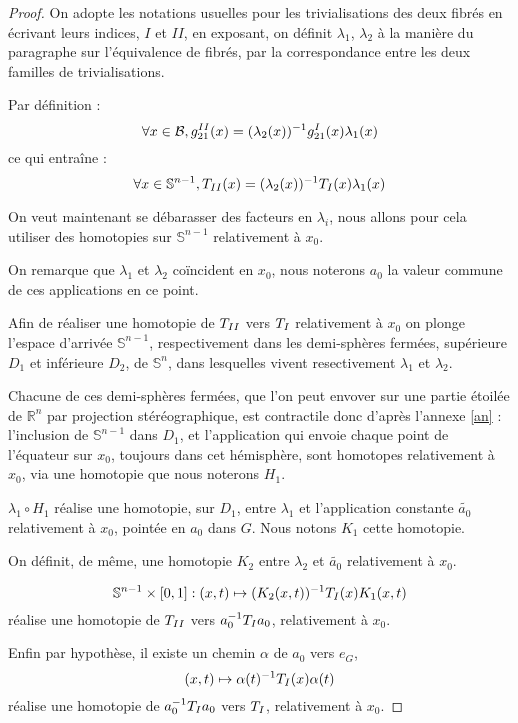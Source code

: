 
\begin{proof}
On adopte les notations usuelles pour les trivialisations des deux fibrés en écrivant leurs indices, $I$ et $II$, en exposant, %
on définit $\lambda_1$, $\lambda_2$ à la manière du paragraphe sur l'équivalence de fibrés, par la correspondance entre les deux familles de trivialisations.

\par
Par définition :
\[\forall x \in \mathcal{B} , g_{21}^{\Rom{2}}(x) = (\lambda_2(x))^{-1} g_{21}^{\Rom{1}}(x) \lambda_1(x)\]
ce qui entraîne :
\[\forall x \in \mathbb{S}^{n-1} , T_{\Rom{2}}(x) = (\lambda_2(x))^{-1} T_{\Rom{1}}(x) \lambda_1(x)\]

\etoile
On veut maintenant se débarasser des facteurs en $\lambda_i$, nous allons pour cela utiliser des homotopies sur $\mathbb{S}^{n-1}$ relativement à $x_0$.

\par
On remarque que $\lambda_1$ et $\lambda_2$ coïncident en $x_0$, nous noterons $a_0$ la valeur commune de ces applications en ce point.

\par
Afin de réaliser une homotopie de $T_{\Rom{2}}$ vers $T_{\Rom{1}}$ relativement à $x_0$ on plonge l'espace d'arrivée $\mathbb{S}^{n-1}$, %
respectivement dans les demi-sphères fermées, supérieure $D_1$ et inférieure $D_2$, de $\mathbb{S}^n$, %
dans lesquelles vivent resectivement $\lambda_1$ et $\lambda_2$.

\par
Chacune de ces demi-sphères fermées, que l'on peut envover sur une partie étoilée de $\mathbb{R}^n$ par projection stéréographique, %
est contractile donc d'après l'annexe \ref{an} : l'inclusion de $\mathbb{S}^{n-1}$ dans $D_1$, %
et l'application qui envoie chaque point de l'équateur sur $x_0$, toujours dans cet hémisphère, %
sont homotopes relativement à $x_0$, via une homotopie que nous noterons $H_1$.

\par
$\lambda_1 \circ H_1$ réalise une homotopie, sur $D_1$, entre $\lambda_1$ et l'application constante $\tilde{a_0}$ relativement à $x_0$, %
pointée en $a_0$ dans $G$. Nous notons $K_1$ cette homotopie.

\par
On définit, de même, une homotopie $K_2$ entre $\lambda_2$ et $\tilde{a_0}$ relativement à $x_0$.

\[\mathbb{S}^{n-1} \times [0,1] : (x,t) \mapsto (K_2(x,t))^{-1} T_{\Rom{1}}(x) K_1(x,t)\]
réalise une homotopie de $T_{\Rom{2}}$ vers $a_0^{-1} T_{\Rom{1}} a_0$, relativement à $x_0$.

\par
Enfin par hypothèse, il existe un chemin $\alpha$ de $a_0$ vers $e_G$,
\[(x,t) \mapsto \alpha(t)^{-1} T_{\Rom{1}}(x) \alpha(t)\]
réalise une homotopie de $a_0^{-1} T_{\Rom{1}} a_0$ vers $T_{\Rom{1}}$, relativement à $x_0$.
\end{proof}

